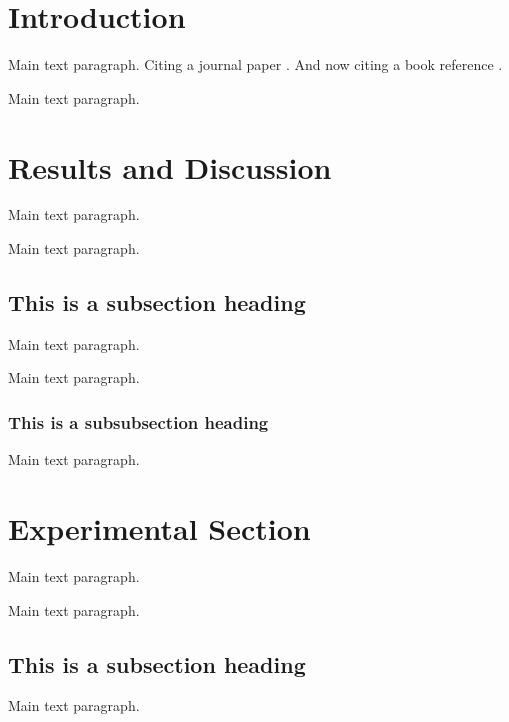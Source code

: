 \documentclass[journal,article,submit,moreauthors,pdftex,12pt,a4paper]{mdpi} %
\begin{document}

\section{Introduction}

Main text paragraph. Citing a journal paper \cite{ref-journal}. And now citing a book reference \cite{ref-book}.

Main text paragraph.


\section{Results and Discussion}

Main text paragraph.


Main text paragraph.


\subsection{This is a subsection heading}

Main text paragraph.

Main text paragraph.


\subsubsection{This is a subsubsection heading}

Main text paragraph.


\section{Experimental Section}

Main text paragraph.


Main text paragraph.

\subsection{This is a subsection heading}

Main text paragraph.

\end{document}
